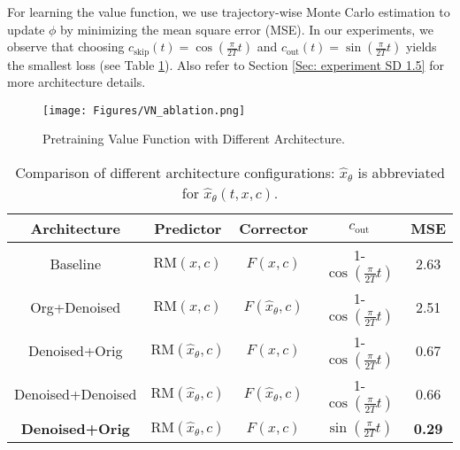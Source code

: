 \documentclass{article}
\theoremstyle{plain}
\theoremstyle{definition}
\theoremstyle{remark}
\begin{document}
For learning the value function, we use trajectory-wise Monte Carlo estimation to update $\phi$ by minimizing the mean square error (MSE). 
In our experiments, we observe that choosing $c_{\text{skip}}(t)=\cos(\frac{\pi}{2T}t)$ and $c_{\text{out}}(t)=\sin(\frac{\pi}{2T}t)$ yields the smallest loss (see Table \ref{tab:architecture_comparison}). 
Also refer to Section \ref{Sec: experiment SD 1.5} for more architecture details.
\vspace{-5pt}
\begin{figure}[htbp]
    \centering
    \texttt{[image: Figures/VN\_ablation.png]}
    \caption{Pretraining Value Function with Different Architecture.}
    \label{fig: VN architecture ablation}
\end{figure}

\begin{table}[htbp]
    \centering
    \begin{minipage}{\columnwidth}
    \small %
    \setlength{\tabcolsep}{3pt} %
    \begin{tabular}{ccccc}
        \toprule
        \multicolumn{1}{c}{Architecture} & 
        \multicolumn{1}{c}{Predictor} & 
        \multicolumn{1}{c}{Corrector} & 
        \multicolumn{1}{c}{$c_{\text{out}}$} & 
        \multicolumn{1}{c}{MSE} \\
        \midrule
        Baseline & $\text{RM}(x,c)$ & $F(x,c)$ & 1-$\cos(\frac{\pi}{2T}t)$ & 2.63 \\
        Org+Denoised & $\text{RM}(x,c)$ & $F(\hat{x}_{\theta},c)$ & 1-$\cos(\frac{\pi}{2T}t)$ & 2.51 \\
        Denoised+Orig & $\text{RM}(\hat{x}_{\theta},c)$ & $F(x,c)$ & 1-$\cos(\frac{\pi}{2T}t)$ & 0.67 \\
        Denoised+Denoised & $\text{RM}(\hat{x}_{\theta},c)$ & $F(\hat{x}_{\theta},c)$ & 1-$\cos(\frac{\pi}{2T}t)$ & 0.66 \\
        \textbf{Denoised+Orig} & $\text{RM}(\hat{x}_{\theta},c)$ & $F(x,c)$ & $\sin(\frac{\pi}{2T}t)$ & \textbf{0.29} \\
        \bottomrule
    \end{tabular}
    \caption{Comparison of different architecture configurations: $\hat{x}_{\theta}$ is abbreviated for $\hat{x}_{\theta}(t,x,c)$.}
    \label{tab:architecture_comparison}
    \end{minipage}
\end{table}

\vspace{-5 pt}
\end{document}
